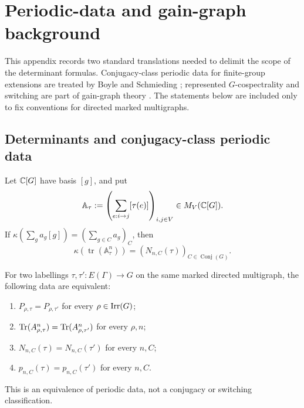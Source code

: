 \section{Periodic-data and gain-graph background}
\label{sec:inverse-background}

This appendix records two standard translations needed to delimit the scope
of the determinant formulas.  Conjugacy-class periodic data for finite-group
extensions are treated by Boyle and Schmieding
\cite{BoyleSchmieding2017FiniteGroupExtensions}; represented
\(G\)-cospectrality and switching are part of gain-graph theory
\cite{Zaslavsky1989BiasedGraphs,CavaleriDAngeliDonno2021BalanceGainGraphs,
CavaleriDonno2022Cospectrality}.  The statements below are included only to
fix conventions for directed marked multigraphs.

\subsection{Determinants and conjugacy-class periodic data}

Let \(\mathbb{C}[G]\) have basis \([g]\), and put
\[
 \mathbb A_\tau:=
 \left(\sum_{e:i\to j}[\tau(e)]\right)_{i,j\in V}\in M_V(\mathbb{C}[G]).
\]
If \(\kappa(\sum_ga_g[g])=(\sum_{g\in C}a_g)_C\), then
\begin{equation}\label{eq:appendix-kappa-periodic-data}
 \kappa\!\left(\operatorname{tr}(\mathbb A_\tau^n)\right)
   =(N_{n,C}(\tau))_{C\in\operatorname{Conj}(G)}.
\end{equation}

\begin{proposition}
\label{prop:comparison-dictionary}
For two labellings \(\tau,\tau':E(\Gamma)\to G\) on the same marked directed
multigraph, the following data are equivalent:
\begin{enumerate}[label=\textup{(\roman*)},leftmargin=*]
 \item \(P_{\rho,\tau}=P_{\rho,\tau'}\) for every
   \(\rho\in\operatorname{Irr}(G)\);
 \item \(\operatorname{Tr}(A_{\rho,\tau}^n)=\operatorname{Tr}(A_{\rho,\tau'}^n)\) for every \(\rho,n\);
 \item \(N_{n,C}(\tau)=N_{n,C}(\tau')\) for every \(n,C\);
 \item \(p_{n,C}(\tau)=p_{n,C}(\tau')\) for every \(n,C\).
\end{enumerate}
This is an equivalence of periodic data, not a conjugacy or switching
classification.
\end{proposition}

